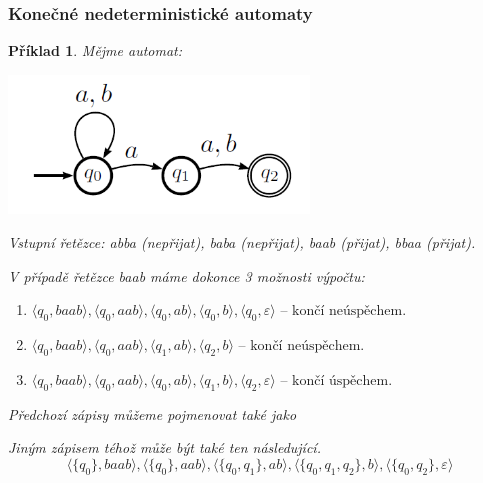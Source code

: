 \documentclass[10pt,a4paper]{article}
\theoremstyle{note}
\newtheorem{priklad}{Příklad}
\begin{document}
\subsubsection{Konečné nedeterministické automaty}

\begin{priklad}
Mějme automat:

\vspace*{40px}
\begin{center}
\includegraphics[width=8cm]{img/KDA-priklad3.png}
\end{center}

Vstupní řetězce: \textit{abba} (nepřijat), \textit{baba} (nepřijat), \textit{baab} (přijat), \textit{bbaa} (přijat).

V případě řetězce \textit{baab} máme dokonce 3 možnosti výpočtu:
\begin{enumerate}
\item
$\langle q_{0}, baab \rangle, \langle q_{0}, aab \rangle, \langle q_{0}, ab \rangle, \langle q_{0}, b \rangle, \langle q_{0}, \varepsilon \rangle \text{ -- končí neúspěchem.}$
\item
$\langle q_{0}, baab \rangle, \langle q_{0}, aab \rangle, \langle q_{1}, ab \rangle, \langle q_{2}, b \rangle \text{ -- končí neúspěchem.}$
\item
$\langle q_{0}, baab \rangle, \langle q_{0}, aab \rangle, \langle q_{0}, ab \rangle, \langle q_{1}, b \rangle, \langle q_{2}, \varepsilon \rangle \text{ -- končí úspěchem.}$ 
\end{enumerate}
Předchozí zápisy můžeme pojmenovat také jako 

Jiným zápisem téhož může být také ten následující.
$$
\langle \lbrace q_{0} \rbrace, baab \rangle, \langle \lbrace q_{0} \rbrace, aab \rangle, \langle \lbrace q_{0}, q_{1} \rbrace, ab \rangle,
\langle \lbrace q_{0}, q_{1}, q_{2} \rbrace, b \rangle, \langle \lbrace q_{0}, q_{2} \rbrace, \varepsilon \rangle
$$ 
\end{priklad}
\end{document}
